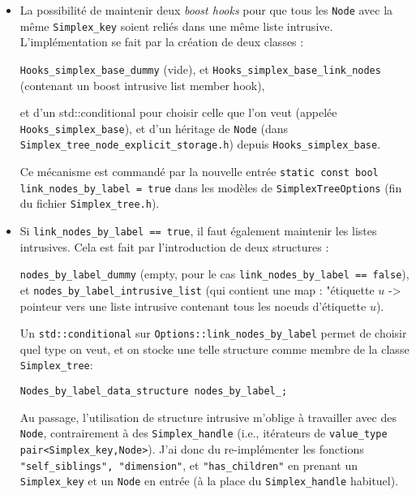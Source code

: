 \documentclass[11pt]{amsart}
\numberwithin{equation}{section}
\theoremstyle{plain}
\theoremstyle{definition}
\begin{document}
\begin{itemize}
\item La possibilité de maintenir deux \emph{boost hooks} pour que tous les {\tt Node} avec la même {\tt Simplex\_key} soient reliés dans une même liste intrusive. L'implémentation se fait par la création de deux classes :

\medskip

{\tt Hooks\_simplex\_base\_dummy} (vide), et
{\tt Hooks\_simplex\_base\_link\_nodes} (contenant un boost intrusive list member hook),

\medskip

et d'un std::conditional pour choisir celle que l'on veut (appelée {\tt Hooks\_simplex\_base}), et d'un héritage de {\tt Node} (dans {\tt Simplex\_tree\_node\_explicit\_storage.h}) depuis {\tt Hooks\_simplex\_base}.

\medskip

Ce mécanisme est commandé par la nouvelle entrée {\tt static const bool link\_nodes\_by\_label = true} dans les modèles de {\tt SimplexTreeOptions} (fin du fichier {\tt Simplex_tree.h}).

\item Si {\tt link\_nodes\_by\_label == true}, il faut également maintenir les listes intrusives. Cela est fait par l'introduction de deux structures :

\medskip

{\tt nodes\_by\_label\_dummy} (empty, pour le cas {\tt link\_nodes\_by\_label == false}), et 
{\tt nodes\_by\_label\_intrusive\_list} (qui contient une map : "étiquette $u$ -> pointeur vers une liste intrusive contenant tous les noeuds d'étiquette $u$).

Un {\tt std::conditional} sur {\tt Options::link\_nodes\_by\_label} permet de choisir quel type on veut, et on stocke une telle structure comme membre de la classe {\tt Simplex\_tree}:

\medskip

  {\tt Nodes\_by\_label\_data\_structure        nodes\_by\_label\_;}

\medskip

Au passage, l'utilisation de structure intrusive m'oblige à travailler avec des {\tt Node}, contrairement à des {\tt Simplex\_handle} (i.e., itérateurs de {\tt value\_type pair<Simplex\_key,Node>}). J'ai donc du re-implémenter les fonctions {\tt "self\_siblings", "dimension"}, et {\tt "has\_children"} en prenant un {\tt Simplex\_key} et un {\tt Node} en entrée (à la place du {\tt Simplex\_handle} habituel).


\end{itemize}
\end{document}
